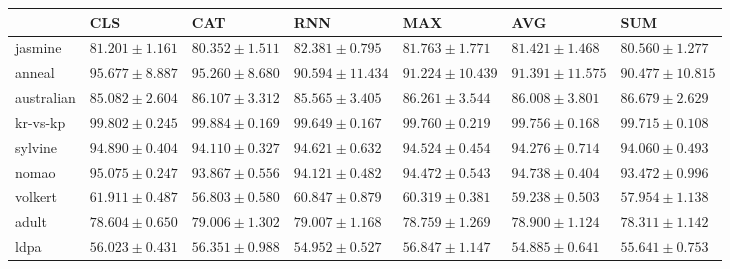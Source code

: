 \begin{tabular}{lllllll}
\toprule
 & CLS & CAT & RNN & MAX & AVG & SUM \\
\midrule
jasmine & $81.201 \pm 1.161$ & $80.352 \pm 1.511$ & $82.381 \pm 0.795$ & $81.763 \pm 1.771$ & $81.421 \pm 1.468$ & $80.560 \pm 1.277$ \\
anneal & $95.677 \pm 8.887$ & $95.260 \pm 8.680$ & $90.594 \pm 11.434$ & $91.224 \pm 10.439$ & $91.391 \pm 11.575$ & $90.477 \pm 10.815$ \\
australian & $85.082 \pm 2.604$ & $86.107 \pm 3.312$ & $85.565 \pm 3.405$ & $86.261 \pm 3.544$ & $86.008 \pm 3.801$ & $86.679 \pm 2.629$ \\
kr-vs-kp & $99.802 \pm 0.245$ & $99.884 \pm 0.169$ & $99.649 \pm 0.167$ & $99.760 \pm 0.219$ & $99.756 \pm 0.168$ & $99.715 \pm 0.108$ \\
sylvine & $94.890 \pm 0.404$ & $94.110 \pm 0.327$ & $94.621 \pm 0.632$ & $94.524 \pm 0.454$ & $94.276 \pm 0.714$ & $94.060 \pm 0.493$ \\
nomao & $95.075 \pm 0.247$ & $93.867 \pm 0.556$ & $94.121 \pm 0.482$ & $94.472 \pm 0.543$ & $94.738 \pm 0.404$ & $93.472 \pm 0.996$ \\
volkert & $61.911 \pm 0.487$ & $56.803 \pm 0.580$ & $60.847 \pm 0.879$ & $60.319 \pm 0.381$ & $59.238 \pm 0.503$ & $57.954 \pm 1.138$ \\
adult & $78.604 \pm 0.650$ & $79.006 \pm 1.302$ & $79.007 \pm 1.168$ & $78.759 \pm 1.269$ & $78.900 \pm 1.124$ & $78.311 \pm 1.142$ \\
ldpa & $56.023 \pm 0.431$ & $56.351 \pm 0.988$ & $54.952 \pm 0.527$ & $56.847 \pm 1.147$ & $54.885 \pm 0.641$ & $55.641 \pm 0.753$ \\
\bottomrule
\end{tabular}
